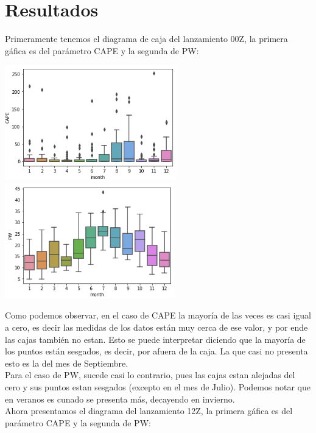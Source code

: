 \documentclass[12pt]{article}
\begin{document}
\section*{Resultados}
Primeramente tenemos el diagrama de caja del lanzamiento 00Z, la primera gáfica es del parámetro CAPE y la segunda de PW:
\begin{center}
	\includegraphics[height=5cm]{01.png} \hspace*{\fill}
    \includegraphics[height=5cm]{011.png}
\end{center}
Como podemos observar, en el caso de CAPE la mayoría de las veces es casi igual a cero, es decir las medidas de los datos están muy cerca de ese valor, y por ende las cajas también no estan. Esto se puede interpretar diciendo que la mayoría de los puntos están sesgados, es decir, por afuera de la caja. La que casi no presenta esto es la del mes de Septiembre. \\

Para el caso de PW, sucede casi lo contrario, pues las cajas estan alejadas del cero y sus puntos estan sesgados (excepto en el mes de Julio). Podemos notar que en veranos es cunado se presenta más, decayendo en invierno.\\

Ahora presentamos el diagrama del lanzamiento 12Z, la primera gáfica es del parámetro CAPE y la segunda de PW:
\end{document}
